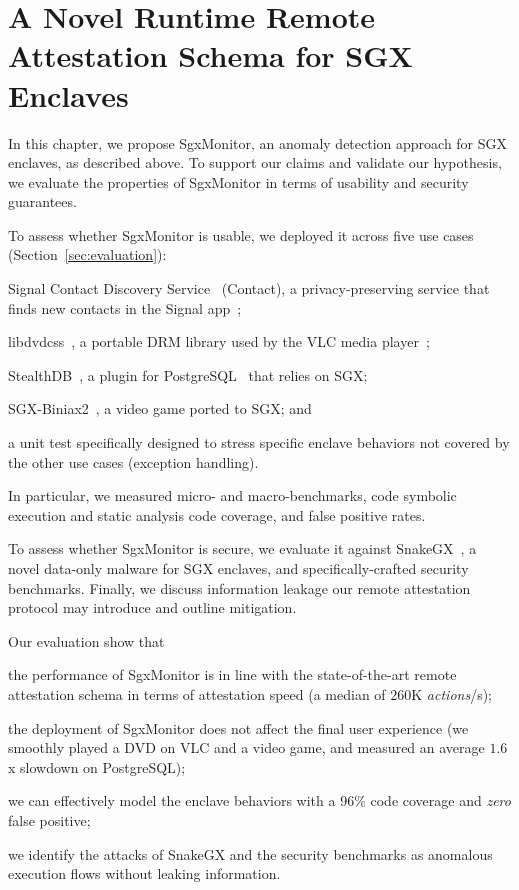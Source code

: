 \chapter{A Novel Runtime Remote Attestation Schema for SGX Enclaves} %
\label{chp:runtime-protection-trusted} 


In this chapter, we propose SgxMonitor, an anomaly detection approach
for SGX enclaves, as described above. To support our claims and validate
our hypothesis, we evaluate the properties of SgxMonitor in terms of 
usability and security 
guarantees.

To assess whether SgxMonitor is usable, we deployed it across five use 
cases (Section~\ref{sec:evaluation}):
\begin{enumerate*}[label=(\roman*)]
	\item Signal Contact Discovery Service~\citep{signalrepo} 
	(\textsf{Contact}), a privacy-preserving service that finds new contacts in 
	the Signal app~\citep{signalapp};
	\item \textsf{libdvdcss}~\citep{libdvdcss}, a portable DRM library used by 
	the VLC media player~\citep{videolan};
	\item \textsf{StealthDB}~\citep{stealthdb}, a plugin for 
	PostgreSQL~\citep{momjian2001postgresql} that relies on SGX;
	\item \textsf{SGX-Biniax2}~\citep{bauman2016case}, a video game 
	ported to SGX; and
	\item a \textsf{unit test} specifically designed to stress specific 
	enclave behaviors not covered by the other use cases (\ie exception 
	handling).
\end{enumerate*}
In particular, we measured micro- and macro-benchmarks, code symbolic
execution and static analysis code coverage, and false positive rates.

To assess whether SgxMonitor is secure, we evaluate
it against SnakeGX~\citep{snakegx}, a novel data-only malware for SGX
enclaves, and specifically-crafted security benchmarks. 
Finally, we discuss information leakage our remote attestation protocol may
introduce and outline mitigation.

Our evaluation show that 
\begin{enumerate*}[label=(\roman*)]
	\item the performance of SgxMonitor is in line with the state-of-the-art
	remote attestation schema in terms of attestation speed (a median of $260$K 
	\emph{actions}/s);
	\item the deployment of SgxMonitor does not affect the final user 
	experience (\eg we smoothly played a DVD on VLC and a video game, and 
	measured an average $1.6$x slowdown on PostgreSQL);
	\item we can effectively model the enclave behaviors with a 96\% code
	coverage and \emph{zero} false positive;
	\item we identify the attacks of SnakeGX and the security benchmarks as 
	anomalous execution
	flows without leaking information.
\end{enumerate*}

